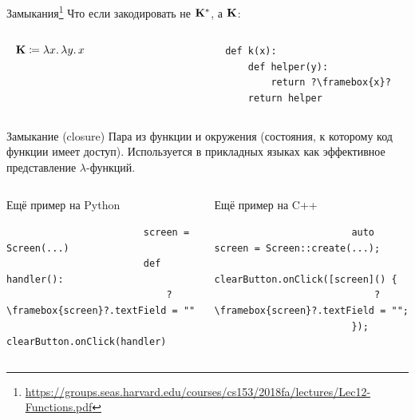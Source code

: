     \begin{frame}[fragile]{Замыкания\footnote{\url{https://groups.seas.harvard.edu/courses/cs153/2018fa/lectures/Lec12-Functions.pdf}}}
        Что если закодировать не $\mathbf{K}^*$, а $\mathbf{K}$:
        \vspace{-1em}
        \begin{columns}[onlytextwidth]
            \begin{column}[t]{0.485\textwidth}
                \vspace{0.5em}
                \[\mathbf{K} \coloneqq \lambda x\ldotp \lambda y\ldotp x\]
            \end{column}\hfill%
            \begin{column}[t]{0.485\textwidth}
                \begin{verbatim}
                    def k(x):
                        def helper(y):
                            return ?\framebox{x}?
                        return helper
                \end{verbatim}
            \end{column}
        \end{columns}
        \pause
        \begin{block}{Замыкание (closure)}
            Пара из функции и окружения (состояния, к которому код функции имеет доступ).
            Используется в прикладных языках как эффективное представление $\lambda$-функций.
        \end{block}
        \pause
        \vspace{-1em}
        \begin{columns}[onlytextwidth]
            \begin{column}[t]{0.485\textwidth}
                \begin{block}{Ещё пример на Python}
                    \begin{verbatim}
                        screen = Screen(...)
                        def handler():
                            ?\framebox{screen}?.textField = ""
                        clearButton.onClick(handler)
                    \end{verbatim}
                \end{block}
            \end{column}\hfill
            \pause%
            \begin{column}[t]{0.485\textwidth}
                \begin{block}{Ещё пример на C++}
                    \begin{verbatim}
                        auto screen = Screen::create(...);
                        clearButton.onClick([screen]() {
                            ?\framebox{screen}?.textField = "";
                        });
                    \end{verbatim}
                \end{block}
            \end{column}
        \end{columns}
    \end{frame}

